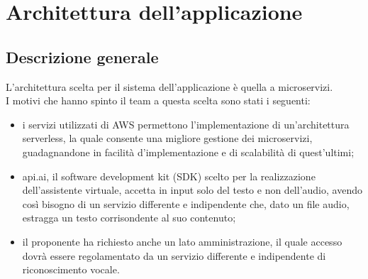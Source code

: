 \section{Architettura dell'applicazione}
\subsection{Descrizione generale}
L'architettura scelta per il sistema dell'applicazione è quella a microservizi.\\
I motivi che hanno spinto il team a questa scelta sono stati i seguenti:
\begin{itemize}
	\item i servizi utilizzati di AWS permettono l'implementazione di un'architettura serverless, la quale consente una migliore gestione dei microservizi, guadagnandone in facilità d'implementazione e di scalabilità di quest'ultimi;
	\item api.ai, il software development kit (SDK) scelto per la realizzazione dell'assistente virtuale, accetta in input solo del testo e non dell'audio, avendo così bisogno di un servizio differente e indipendente che, dato un file audio, estragga un testo corrisondente al suo contenuto;
	\item il proponente ha richiesto anche un lato amministrazione, il quale accesso dovrà essere regolamentato da un servizio differente e indipendente di riconoscimento vocale.
\end{itemize}

